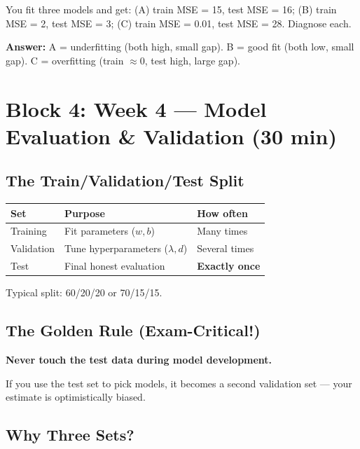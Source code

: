 \documentclass[11pt,a4paper]{article}
\begin{document}
\begin{tcolorbox}[colback=blue!5,colframe=blue!50,title=Mini-Exercise (3 min)]
You fit three models and get: (A) train MSE = 15, test MSE = 16; (B) train MSE = 2, test MSE = 3; (C) train MSE = 0.01, test MSE = 28. Diagnose each.
\end{tcolorbox}
\noindent\textbf{Answer:} A = underfitting (both high, small gap). B = good fit (both low, small gap). C = overfitting (train $\approx 0$, test high, large gap).

\section{Block 4: Week 4 --- Model Evaluation \& Validation (30 min)}

\subsection{The Train/Validation/Test Split}

\begin{center}
\begin{tabular}{|l|l|l|}
\hline
\textbf{Set} & \textbf{Purpose} & \textbf{How often} \\
\hline
Training & Fit parameters ($w, b$) & Many times \\
Validation & Tune hyperparameters ($\lambda, d$) & Several times \\
Test & Final honest evaluation & \textbf{Exactly once} \\
\hline
\end{tabular}
\end{center}

Typical split: 60/20/20 or 70/15/15.

\subsection{The Golden Rule (Exam-Critical!)}

\begin{tcolorbox}[colback=red!5,colframe=red!50]
\textbf{Never touch the test data during model development.}
\end{tcolorbox}

If you use the test set to pick models, it becomes a second validation set --- your estimate is optimistically biased.

\subsection{Why Three Sets?}
\end{document}
